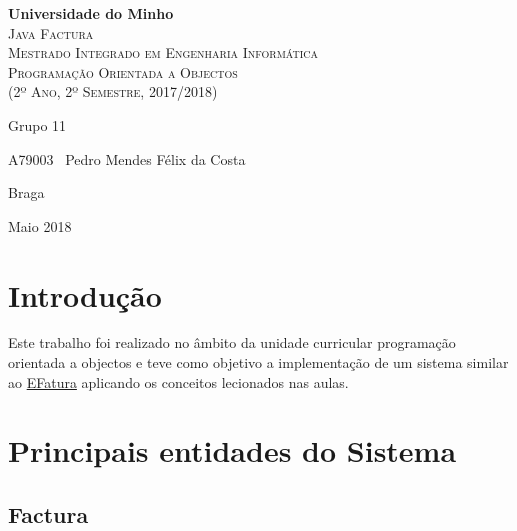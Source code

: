 \documentclass[12pt,a4paper]{report}
\begin{document}
\begin{titlepage}
    \center
    {\huge {\bf Universidade do Minho}}\\[0.4cm]
    \vspace{3.0cm}
    \textsc{\huge{Java Factura}}\\[0.5cm]
    \vspace{3.0cm}
    \textsc{\huge{Mestrado Integrado em Engenharia Informática}}\\[0.5cm]
    \vspace{2.0cm}
    \textsc{Programação Orientada a Objectos}\\[0.5cm]
    \textsc{(2º Ano, 2º Semestre, 2017/2018)}\\[0.5cm]
    \vspace{1.5cm}
    \begin{flushleft}
        Grupo 11
        \vspace{1cm}

        A79003 \,\,\,Pedro Mendes Félix da Costa
    \end{flushleft}
        \vspace{1cm}
    \begin{flushright}
        Braga

        Maio 2018
    \end{flushright}

\end{titlepage}

\tableofcontents
\listoffigures

\chapter{Introdução}
    Este trabalho foi realizado no âmbito da unidade curricular programação
    orientada a objectos e teve como objetivo a implementação de um sistema
    similar ao \href{https://faturas.portaldasfinancas.gov.pt}{EFatura}
    aplicando os conceitos lecionados nas aulas.

\chapter{Principais entidades do Sistema}
    \section{Factura}
\end{document}
